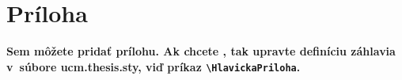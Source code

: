 \chapter*{Príloha}

{\bf Sem môžete pridať prílohu. Ak chcete , tak upravte definíciu
  záhlavia v~súbore ucm.thesis.sty, viď príkaz \verb+\HlavickaPriloha+.}
 \medskip

